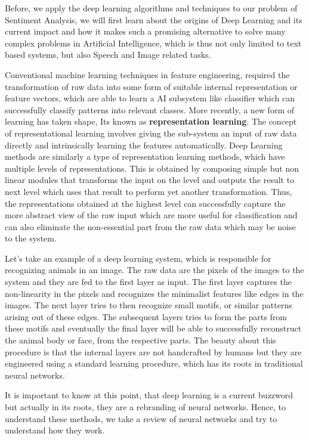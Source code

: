 Before, we apply the deep learning algorithms and techniques to our problem of Sentiment Analysis,  we will first learn about the origins of Deep Learning and its current impact and how it makes such a promising alternative to solve many complex problems in Artificial Intelligence, which is thus not only limited to text based systems, but also Speech and Image related tasks. 
\newline

Conventional machine learning techniques in feature engineering, required the transformation of raw data into some form of suitable internal representation or feature vectors, which are able to learn a AI subsystem like classifier which can successfully classify patterns into relevant classes. More recently, a new form of learning has taken shape, Its known as \textbf{representation learning}.    The concept of representational learning involves giving the sub-system an input of raw data directly and intrinsically learning the features automatically. Deep Learning methods are similarly a type of representation learning methods, which have multiple levels of representations. This is obtained by composing simple but non linear modules that transforms the input on the level and outputs the result to next level which uses that result to perform yet another transformation. Thus, the representations obtained at the highest level can successfully capture the more abstract view of the raw input which are more useful for classification and can also eliminate the non-essential part from the raw data which may be noise to the system.   

Let's take an example of a deep  learning system, which is responsible for recognizing animals in an image. The raw data are the pixels of the images to the system and they are fed to the first layer as input. The first layer  captures the non-linearity in the pixels and recognizes the minimalist features like edges in the images. The next layer tries to then recognize small motifs, or similar patterns arising out of these edges. The subsequent layers tries to form the parts from these motifs and eventually the final layer will be able to successfully reconstruct the animal body or face, from the respective parts. The beauty about this procedure is that the internal layers are not handcrafted by humans but they are engineered using a standard learning procedure, which has its roots in traditional neural networks.

It is important to know at this point, that deep learning is a current buzzword but actually in its roots, they are a rebranding of neural networks. Hence, to understand these methods, we take a review of neural networks and try to understand how they work.    
  
